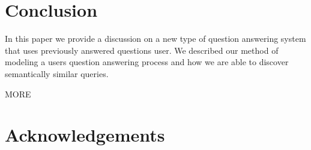 
\section{Conclusion}

In this paper we provide a discussion on a new type of question answering system that uses previously answered questions user.  We described our method of modeling a users question answering process and how we are able to discover semantically similar queries.

MORE

\section{Acknowledgements}
